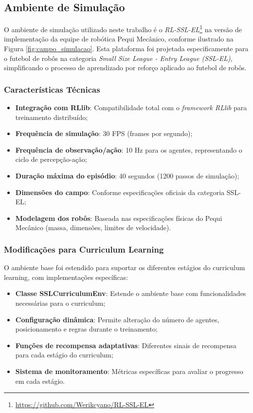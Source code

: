 \subsection{Ambiente de Simulação}

O ambiente de simulação utilizado neste trabalho é o \textit{RL-SSL-EL}\footnote{\url{https://github.com/Werikcyano/RL-SSL-EL}} na versão de implementação da equipe de robótica Pequi Mecânico, conforme ilustrado na Figura \ref{fig:campo_simulacao}. Esta plataforma foi projetada especificamente para o futebol de robôs na categoria \textit{Small Size League - Entry League (SSL-EL)}, simplificando o processo de aprendizado por reforço aplicado ao futebol de robôs.

\subsubsection{Características Técnicas}

\begin{itemize}
    \item \textbf{Integração com RLlib}: Compatibilidade total com o \textit{framework RLlib} para treinamento distribuído;
    \item \textbf{Frequência de simulação}: 30 FPS (frames por segundo);
    \item \textbf{Frequência de observação/ação}: 10 Hz para os agentes, representando o ciclo de percepção-ação;
    \item \textbf{Duração máxima do episódio}: 40 segundos (1200 passos de simulação);
    \item \textbf{Dimensões do campo}: Conforme especificações oficiais da categoria SSL-EL;
    \item \textbf{Modelagem dos robôs}: Baseada nas especificações físicas do Pequi Mecânico (massa, dimensões, limites de velocidade).
\end{itemize}

\subsubsection{Modificações para Curriculum Learning}

O ambiente base foi estendido para suportar os diferentes estágios do curriculum learning, com implementações específicas:

\begin{itemize}
    \item \textbf{Classe SSLCurriculumEnv}: Estende o ambiente base com funcionalidades necessárias para o curriculum;
    \item \textbf{Configuração dinâmica}: Permite alteração do número de agentes, posicionamento e regras durante o treinamento;
    \item \textbf{Funções de recompensa adaptativas}: Diferentes sinais de recompensa para cada estágio do curriculum;
    \item \textbf{Sistema de monitoramento}: Métricas específicas para avaliar o progresso em cada estágio.
\end{itemize}

